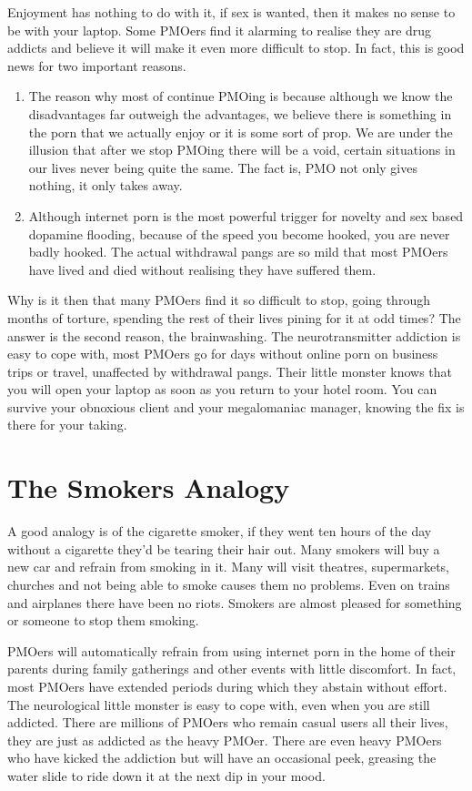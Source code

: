 \documentclass[easypeasy.tex]{subfiles}
\begin{document}
Enjoyment has nothing to do with it, if sex is wanted, then it makes no sense to be with your laptop. Some PMOers find it alarming to realise they are drug addicts and believe it will make it even more difficult to stop. In fact, this is good news for two important reasons.
    \begin{enumerate}
      \item The reason why most of continue PMOing is because although we know the disadvantages far outweigh the advantages, we believe there is something in the porn that we actually enjoy or it is some sort of prop. We are under the illusion that after we stop PMOing there will be a void, certain situations in our lives never being quite the same. The fact is, PMO not only gives nothing, it only takes away.

      \item Although internet porn is the most powerful trigger for novelty and sex based dopamine flooding, because of the speed you become hooked, you are never badly hooked. The actual withdrawal pangs are so mild that most PMOers have lived and died without realising they have suffered them.
    \end{enumerate}
Why is it then that many PMOers find it so difficult to stop, going through months of torture, spending the rest of their lives pining for it at odd times? The answer is the second reason, the brainwashing. The neurotransmitter addiction is easy to cope with, most PMOers go for days without online porn on business trips or travel, unaffected by withdrawal pangs. Their little monster knows that you will open your laptop as soon as you return to your hotel room. You can survive your obnoxious client and your megalomaniac manager, knowing the fix is there for your taking.

\section{The Smokers Analogy}
A good analogy is of the cigarette smoker, if they went ten hours of the day without a cigarette they'd be tearing their hair out. Many smokers will buy a new car and refrain from smoking in it. Many will visit theatres, supermarkets, churches and not being able to smoke causes them no problems. Even on trains and airplanes there have been no riots. Smokers are almost pleased for something or someone to stop them smoking.

PMOers will automatically refrain from using internet porn in the home of their parents during family gatherings and other events with little discomfort. In fact, most PMOers have extended periods during which they abstain without effort. The neurological little monster is easy to cope with, even when you are still addicted. There are millions of PMOers who remain casual users all their lives, they are just as addicted as the heavy PMOer. There are even heavy PMOers who have kicked the addiction but will have an occasional peek, greasing the water slide to ride down it at the next dip in your mood.
\end{document}
